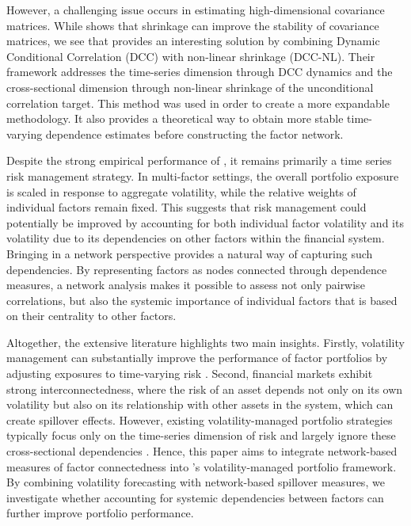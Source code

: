 \documentclass[11pt]{article}
\begin{document}
However, a challenging issue occurs in estimating high-dimensional covariance matrices. While \cite{ledoit2004well} shows that shrinkage can improve the stability of covariance matrices, we see that \cite{engle2019large} provides an interesting solution by combining Dynamic Conditional Correlation (DCC) with non-linear shrinkage (DCC-NL). Their framework addresses the time-series dimension through DCC dynamics and the cross-sectional dimension through non-linear shrinkage of the unconditional correlation target. This method was used in order to create a more expandable methodology. It also provides a theoretical way to obtain more stable time-varying dependence estimates before constructing the factor network.


Despite the strong empirical performance of \cite{moreira2017volatility}, it remains primarily a time series risk management strategy. In multi-factor settings, the overall portfolio exposure is scaled in response to aggregate volatility, while the relative weights of individual factors remain fixed. This suggests that risk management could potentially be improved by accounting for both individual factor volatility and its volatility due to its dependencies on other factors within the financial system. 
Bringing in a network perspective provides a natural way of capturing such dependencies. By representing factors as nodes connected through dependence measures, a network analysis makes it possible to assess not only pairwise correlations, but also the systemic importance of individual factors that is based on their centrality to other factors.

Altogether, the extensive literature highlights two main insights. Firstly, volatility management can substantially improve the performance of factor portfolios by adjusting exposures to time-varying risk \citep{moreira2017volatility}. Second, financial markets exhibit strong interconnectedness, where the risk of an asset depends not only on its own volatility but also on its relationship with other assets in the system, which can create spillover effects. However, existing volatility-managed portfolio strategies typically focus only on the time-series dimension of risk and largely ignore these cross-sectional dependencies \citep{DieboldYilmaz2009, MusmeciAsteDiMatteo2014, peralta2016network}. Hence, this paper aims to integrate network-based measures of factor connectedness into \cite{moreira2017volatility}'s volatility-managed portfolio framework. By combining volatility forecasting with network-based spillover measures, we investigate whether accounting for systemic dependencies between factors can further improve portfolio performance.
\end{document}
